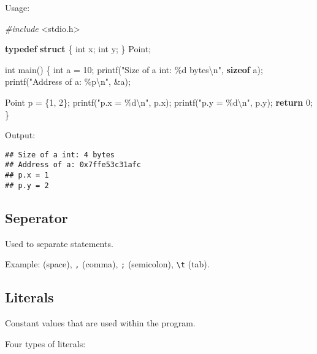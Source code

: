 \documentclass[
]{article}
\newenvironment{Shaded}{\begin{snugshade}}{\end{snugshade}}
\newcommand{\ControlFlowTok}[1]{\textcolor[rgb]{0.13,0.29,0.53}{\textbf{#1}}}
\newcommand{\DataTypeTok}[1]{\textcolor[rgb]{0.13,0.29,0.53}{#1}}
\newcommand{\DecValTok}[1]{\textcolor[rgb]{0.00,0.00,0.81}{#1}}
\newcommand{\ImportTok}[1]{#1}
\newcommand{\KeywordTok}[1]{\textcolor[rgb]{0.13,0.29,0.53}{\textbf{#1}}}
\newcommand{\NormalTok}[1]{#1}
\newcommand{\PreprocessorTok}[1]{\textcolor[rgb]{0.56,0.35,0.01}{\textit{#1}}}
\newcommand{\SpecialCharTok}[1]{\textcolor[rgb]{0.00,0.00,0.00}{#1}}
\newcommand{\StringTok}[1]{\textcolor[rgb]{0.31,0.60,0.02}{#1}}
\begin{document}
Usage:

\begin{Shaded}
\begin{Highlighting}[]
\PreprocessorTok{\#include }\ImportTok{\textless{}stdio.h\textgreater{}}

\KeywordTok{typedef} \KeywordTok{struct}\NormalTok{ \{}
    \DataTypeTok{int}\NormalTok{ x;}
    \DataTypeTok{int}\NormalTok{ y;}
\NormalTok{\} Point;}

\DataTypeTok{int}\NormalTok{ main() \{}
    \DataTypeTok{int}\NormalTok{ a = }\DecValTok{10}\NormalTok{;}
\NormalTok{    printf(}\StringTok{"Size of a int: \%d bytes}\SpecialCharTok{\textbackslash{}n}\StringTok{"}\NormalTok{, }\KeywordTok{sizeof}\NormalTok{ a);}
\NormalTok{    printf(}\StringTok{"Address of a: \%p}\SpecialCharTok{\textbackslash{}n}\StringTok{"}\NormalTok{, \&a);}

\NormalTok{    Point p = \{}\DecValTok{1}\NormalTok{, }\DecValTok{2}\NormalTok{\};}
\NormalTok{    printf(}\StringTok{"p.x = \%d}\SpecialCharTok{\textbackslash{}n}\StringTok{"}\NormalTok{, p.x);}
\NormalTok{    printf(}\StringTok{"p.y = \%d}\SpecialCharTok{\textbackslash{}n}\StringTok{"}\NormalTok{, p.y);}
    \ControlFlowTok{return} \DecValTok{0}\NormalTok{;}
\NormalTok{\}}
\end{Highlighting}
\end{Shaded}

Output:

\begin{verbatim}
## Size of a int: 4 bytes
## Address of a: 0x7ffe53c31afc
## p.x = 1
## p.y = 2
\end{verbatim}

\hypertarget{seperator}{%
\subsection{Seperator}\label{seperator}}

Used to separate statements.

Example: \texttt{} (space), \texttt{,} (comma), \texttt{;} (semicolon),
\texttt{\textbackslash{}t} (tab).

\hypertarget{literals}{%
\subsection{Literals}\label{literals}}

Constant values that are used within the program.

Four types of literals:
\end{document}
